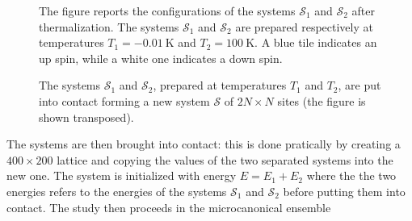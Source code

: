\begin{figure}[hbtp]
\begin{minipage}[c]{0.45\textwidth}
    \end{minipage}
    \hfill
    \caption{The figure reports the configurations of the systems $\mathcal{S}_1$ and $\mathcal{S}_2$ after thermalization. The systems $\mathcal{S}_1$ and $\mathcal{S}_2$ are prepared respectively at temperatures $T_1 = \SI{-0.01}{\kelvin}$ and $T_2 = \SI{100}{\kelvin}$. A blue tile indicates an up spin, while a white one indicates a down spin.}
    \label{fig:contact_initial}
\end{figure}
\vspace{10pt}
\begin{figure}[htbp]
    \centering
    \caption{The systems $\mathcal{S}_1$ and $\mathcal{S}_2$, prepared at temperatures $T_1$ and $T_2$, are put into contact forming a new system $\mathcal{S}$ of $2N \times N$ sites (the figure is shown transposed).}
    \label{fig:contact_symbolized}
\end{figure}
The systems are then brought into contact: this is done pratically by creating a $400 \times 200$ lattice and copying the values of the two separated systems into the new one. The system is initialized 
with energy $E = E_1 + E_2$ where the the two energies refers to the energies of the systems $\mathcal{S}_1$ and $\mathcal{S}_2$ before putting them into contact. The study then proceeds in the microcanonical ensemble 
